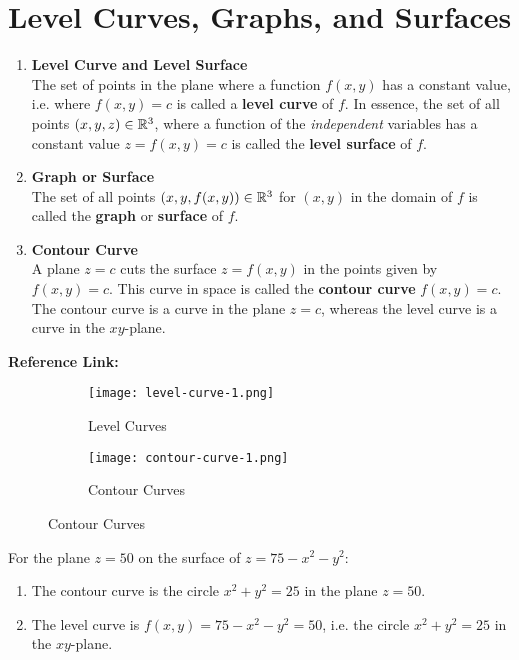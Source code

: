 \section{Level Curves, Graphs, and Surfaces}
\begin{enumerate}
    \item \textbf{Level Curve and Level Surface} \\
    The set of points in the plane where a function $f(x, y)$ has a constant value, i.e. where $f(x, y) = c$
    is called a \textbf{level curve} of $f$. In essence, the set of all points $(x, y, z) \in \mathbb{R}^3$, where
    a function of the \textit{independent} variables has a constant value $z = f(x, y) = c$ is called the
    \textbf{level surface} of $f$.

    \item \textbf{Graph or Surface} \\
    The set of all points $(x, y, f(x, y)) \in \mathbb{R}^3$ for $(x, y)$ in the domain of $f$ is called the
    \textbf{graph} or \textbf{surface} of $f$.

    \item \textbf{Contour Curve} \\
    A plane $z = c$ cuts the surface $z = f(x, y)$ in the points given by $f(x, y) = c$. This curve in space
    is called the \textbf{contour curve} $f(x, y) = c$. The contour curve is a curve in the plane $z = c$,
    whereas the level curve is a curve in the $xy$-plane.
\end{enumerate}

\textbf{Reference Link:}

\begin{figure}[h]
    \begin{subfigure}[b]{0.5\textwidth}
        \centering
        \texttt{[image: level-curve-1.png]}
        \caption{Level Curves}
    \end{subfigure}
    \hfill
    \begin{subfigure}[b]{0.5\textwidth}
        \centering
        \texttt{[image: contour-curve-1.png]}
        \caption{Contour Curves}
    \end{subfigure}
\end{figure}

\begin{example}
    \normalfont For the plane $z = 50$ on the surface of $z = 75 - x^2 - y^2$:
    \begin{enumerate}
        \item The contour curve is the circle $x^2 + y^2 = 25$ in the plane $z = 50$.
        \item The level curve is $f(x, y) = 75 - x^2 - y^2 = 50$, i.e. the circle $x^2 + y^2 = 25$ in the $xy$-plane.
    \end{enumerate}
\end{example}